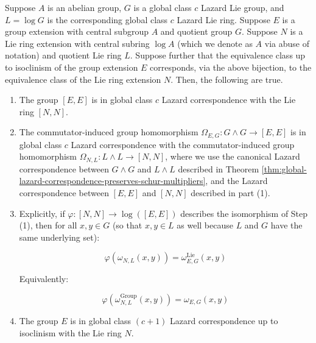 \documentclass{ucetd}
\begin{document}
\begin{theorem}\label{thm:glcuti-extensions-implies-glcuti}
  Suppose $A$ is an abelian group, $G$ is a global class $c$ Lazard Lie
  group, and $L = \log G$ is the corresponding global class $c$ Lazard
  Lie ring. Suppose $E$ is a group extension with central subgroup $A$
  and quotient group $G$. Suppose $N$ is a Lie ring extension with
  central subring $\log A$ (which we denote as $A$ via abuse of
  notation) and quotient Lie ring $L$. Suppose further that the
  equivalence class up to isoclinism of the group extension $E$
  corresponds, via the above bijection, to the equivalence class of
  the Lie ring extension $N$. Then, the following are true.

  \begin{enumerate}
  \item The group $[E,E]$ is in global class $c$ Lazard correspondence
    with the Lie ring $[N,N]$.
  \item The commutator-induced group homomorphism $\Omega_{E,G}: G
    \wedge G \to [E,E]$ is in global class $c$ Lazard correspondence
    with the commutator-induced group homomorphism $\Omega_{N,L}: L
    \wedge L \to [N,N]$, where we use the canonical Lazard
    correspondence between $G \wedge G$ and $L \wedge L$ described in
    Theorem
    \ref{thm:global-lazard-correspondence-preserves-schur-multipliers},
    and the Lazard correspondence between $[E,E]$ and $[N,N]$
    described in part (1).
  \item Explicitly, if $\varphi:[N,N] \to \log([E,E])$ describes the
    isomorphism of Step (1), then for all $x,y \in G$ (so that $x,y
    \in L$ as well because $L$ and $G$ have the same underlying set):

    $$\varphi(\omega_{N,L}(x,y)) = \omega^{\text{Lie}}_{E,G}(x,y)$$

    Equivalently:

    $$\varphi(\omega^{\text{Group}}_{N,L}(x,y)) = \omega_{E,G}(x,y)$$

  \item The group $E$ is in global class $(c + 1)$ Lazard
    correspondence up to isoclinism with the Lie ring $N$.
  \end{enumerate}
\end{theorem}
\end{document}

